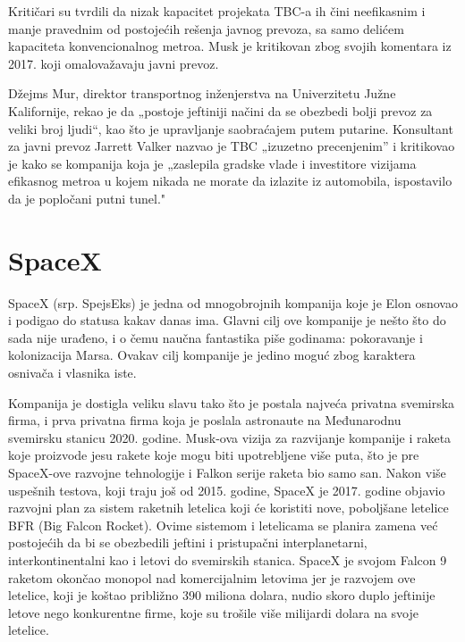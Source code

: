 \documentclass[a4paper,11pt]{article}
\begin{document}
Kritičari su tvrdili da nizak kapacitet projekata TBC-a ih čini neefikasnim i manje pravednim od postojećih rešenja javnog prevoza, sa samo delićem kapaciteta konvencionalnog metroa. Musk je kritikovan zbog svojih komentara iz 2017. koji omalovažavaju javni prevoz.

Džejms Mur, direktor transportnog inženjerstva na Univerzitetu Južne Kalifornije, rekao je da „postoje jeftiniji načini da se obezbedi bolji prevoz za veliki broj ljudi“, kao što je upravljanje saobraćajem putem putarine. Konsultant za javni prevoz Jarrett Valker nazvao je TBC „izuzetno precenjenim” i kritikovao je kako se kompanija koja je „zaslepila gradske vlade i investitore vizijama efikasnog metroa u kojem nikada ne morate da izlazite iz automobila, ispostavilo da je popločani putni tunel."


\section{SpaceX}
\label{sec:SpaceX}

SpaceX (srp. SpejsEks) je jedna od mnogobrojnih kompanija koje je Elon osnovao i podigao do statusa kakav danas ima. Glavni cilj ove kompanije je nešto što do sada nije urađeno, i o čemu naučna fantastika piše godinama: pokoravanje i kolonizacija Marsa. Ovakav cilj kompanije je jedino moguć zbog karaktera osnivača i vlasnika iste. 

Kompanija je dostigla veliku slavu tako što je postala najveća privatna svemirska firma, i prva privatna firma koja je poslala astronaute na Međunarodnu svemirsku stanicu 2020. godine. Musk-ova vizija za razvijanje kompanije i raketa koje proizvode jesu rakete koje mogu biti upotrebljene više puta, što je pre SpaceX-ove razvojne tehnologije i Falkon serije raketa bio samo san. Nakon više uspešnih testova, koji traju još od 2015. godine, SpaceX je 2017. godine objavio razvojni plan za sistem raketnih letelica koji će koristiti nove, poboljšane letelice BFR (Big Falcon Rocket). Ovime sistemom i letelicama se planira zamena već postojećih da bi se obezbedili jeftini i pristupačni interplanetarni, interkontinentalni kao i letovi do svemirskih stanica. SpaceX je svojom Falcon 9 raketom okončao monopol nad komercijalnim letovima jer je razvojem ove letelice, koji je koštao približno 390 miliona dolara, nudio skoro duplo jeftinije letove nego konkurentne firme, koje su trošile više milijardi dolara na svoje letelice. 
\end{document}
